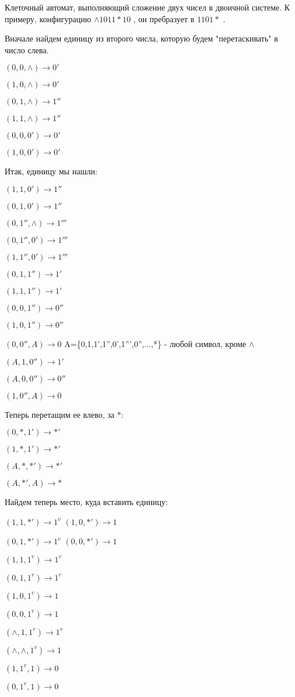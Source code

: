 \documentclass[12pt,a4paper]{article}
\begin{document}
Клеточный автомат, выполняющий сложение двух чисел в двоичной системе. К примеру, конфигурацию  $\wedge1011\ast 10$ , он пребразует в $1101\ast$ .

Вначале найдем единицу из второго числа, которую будем "перетаскивать" в число слева.

$(0,0,\wedge)\to 0'$

$(1,0,\wedge)\to 0'$

$(0,1,\wedge)\to 1''$

$(1,1,\wedge)\to 1''$

$(0,0,0')\to 0'$

$(1,0,0')\to 0'$

Итак, единицу мы нашли:

$(1,1,0')\to 1''$

$(0,1,0')\to 1''$

$(0,1'',\wedge)\to 1'''$

$(0,1'',0')\to 1'''$

$(1,1'',0')\to 1'''$

$(0,1,1'')\to 1'$

$(1,1,1'')\to 1'$

$(0,0,1'')\to 0''$

$(1,0,1'')\to 0''$

$(0,0'',A)\to 0$  A=\{0,1,1',1'',0',1''',0'',...,*\} - любой символ, кроме $\wedge$

$(A,1,0'')\to 1'$

$(A,0,0'')\to 0''$

$(1,0'',A)\to 0$

Теперь перетащим ее влево, за $\ast$:

$(0,*,1')\to *'$

$(1,*,1')\to *'$

$(A,*,*')\to *'$

$(A,*',A)\to *$

Найдем теперь место, куда вставить единицу:

$(1,1,*')\to 1^v$
$(1,0,*')\to 1$

$(0,1,*')\to 1^v$
$(0,0,*')\to 1$


$(1,1,1^v)\to 1^v$

$(0,1,1^v)\to 1^v$

$(1,0,1^v)\to 1$

$(0,0,1^v)\to 1$

$(\wedge,1,1^v)\to 1^v$

$(\wedge,\wedge,1^v)\to 1$

$(1,1^v,1)\to 0$

$(0,1^v,1)\to 0$
\end{document}
